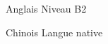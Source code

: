 
\begin{cvskills}

  \cvskill
    {Anglais} %
    {Niveau B2} %

  \cvskill
    {Chinois} %
    {Langue native} %
    
\end{cvskills}
